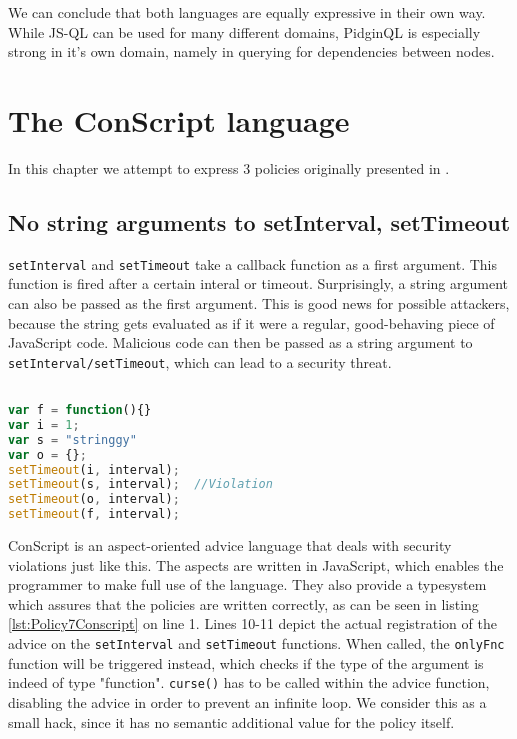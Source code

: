 We can conclude that both languages are equally expressive in their own way. While JS-QL can be used for many different domains, PidginQL is especially strong in it's own domain, namely in querying for dependencies between nodes.

\section{The ConScript language}
\label{sec:ValidationConscript}

In this chapter we attempt to express 3 policies originally presented in \cite{ConScript}.

\subsection{No string arguments to setInterval, setTimeout}

\texttt{setInterval} and \texttt{setTimeout} take a callback function as a first argument. This function is fired after a certain interal or timeout. Surprisingly, a string argument can also be passed as the first argument. This is good news for possible attackers, because the string gets evaluated as if it were a regular, good-behaving piece of JavaScript code. Malicious code can then be passed as a string argument to \texttt{setInterval/setTimeout}, which can lead to a security threat.


\begin{lstlisting}[label={lst:JSSetTimeout},language=JavaScript,caption=No string arguments to setTimeout,mathescape=true]  % float=t?

var f = function(){}
var i = 1;
var s = "stringgy"
var o = {};
setTimeout(i, interval);
setTimeout(s, interval);  //Violation
setTimeout(o, interval);
setTimeout(f, interval);
\end{lstlisting}

ConScript is an aspect-oriented advice language that deals with security violations just like this. The aspects are written in JavaScript, which enables the programmer to make full use of the language. They also provide a typesystem which assures that the policies are written correctly, as can be seen in listing \ref{lst:Policy7Conscript} on line 1. Lines 10-11 depict the actual registration of the advice on the \texttt{setInterval} and \texttt{setTimeout} functions. When called, the \texttt{onlyFnc} function will be triggered instead, which checks if the type of the argument is indeed of type "function". \texttt{curse()} has to be called within the advice function, disabling the advice in order to prevent an infinite loop. We consider this as a small hack, since it has no semantic additional value for the policy itself.

